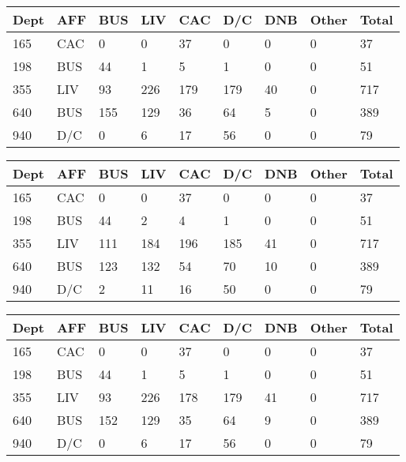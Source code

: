 \documentclass{acm_proc_article-sp}
\begin{document}
		\begin{center}
			 \label{tab:title} 
			\begin{tabular} { | l | l | l | l | l | l | l | l | l | }
				\hline
				Dept & AFF & BUS & LIV & CAC & D/C & DNB & Other & Total \\ \hline
				165 & CAC & 0 & 0 & 37 & 0 & 0 & 0 & 37 \\ \hline
				198 & BUS & 44 & 1 & 5 & 1 & 0 & 0 & 51 \\ \hline
				355 & LIV & 93 & 226 & 179 & 179 & 40 & 0 & 717 \\ \hline
				640 & BUS & 155 & 129 & 36 & 64 & 5 & 0 & 389 \\ \hline
				940 & D/C & 0 & 6 & 17 & 56 & 0 & 0 & 79 \\ \hline
			\end{tabular}
		\end{center}

		\begin{center}
			 \label{tab:title} 
			\begin{tabular} { | l | l | l | l | l | l | l | l | l | }
				\hline
				Dept & AFF & BUS & LIV & CAC & D/C & DNB & Other & Total \\ \hline
				165 & CAC & 0 & 0 & 37 & 0 & 0 & 0 & 37 \\ \hline
				198 & BUS & 44 & 2 & 4 & 1 & 0 & 0 & 51 \\ \hline
				355 & LIV & 111 & 184 & 196 & 185 & 41 & 0 & 717 \\ \hline
				640 & BUS & 123 & 132 & 54 & 70 & 10 & 0 & 389 \\ \hline
				940 & D/C & 2 & 11 & 16 & 50 & 0 & 0 & 79 \\ \hline
			\end{tabular}
		\end{center}

		\begin{center}
			 \label{tab:title} 
			\begin{tabular} { | l | l | l | l | l | l | l | l | l | }
				\hline
				Dept & AFF & BUS & LIV & CAC & D/C & DNB & Other & Total \\ \hline
				165 & CAC & 0 & 0 & 37 & 0 & 0 & 0 & 37 \\ \hline
				198 & BUS & 44 & 1 & 5 & 1 & 0 & 0 & 51 \\ \hline
				355 & LIV & 93 & 226 & 178 & 179 & 41 & 0 & 717 \\ \hline
				640 & BUS & 152 & 129 & 35 & 64 & 9 & 0 & 389 \\ \hline
				940 & D/C & 0 & 6 & 17 & 56 & 0 & 0 & 79 \\ \hline
			\end{tabular}
		\end{center}
\end{document}
